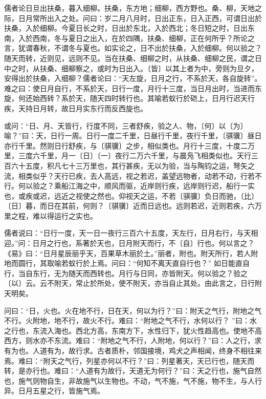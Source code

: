 \documentclass[]{article}
\begin{document}
儒者论日旦出扶桑，暮入细柳。扶桑，东方地；细柳，西方野也。桑、柳，天地之际，日月常所出入之处。问曰：岁二月八月时，日出正东，日入正西，可谓日出於扶桑，入於细柳。今夏日长之时，日出於东北，入於西北；冬日短之时，日出东南，入於西南，冬与夏日之出入，在於四隅，扶桑、细柳，正在何所乎？所论之言，犹谓春秋，不谓冬与夏也。如实论之，日不出於扶桑，入於细柳。何以验之？随天而转，近则见，远则不见。当在扶桑、细柳之时，从扶桑、细柳之民，谓之日中之时，从扶桑、细柳察之，或时为日出入。〔皆〕以其上者为中，旁则为旦夕，安得出於扶桑，入细柳？儒者论曰：``天左旋，日月之行，不系於天，各自旋转''。难之曰：使日月自行，不系於天，日行一度，月行十三度，当日月出时，当进而东旋，何还始西转？系於天，随天四时转行也。其喻若蚁行於硙上，日月行迟天行疾，天持日月转，故日月实东行而反西旋也。

或问：``日、月、天皆行，行度不同，三者舒疾，验之人、物，〔何〕以〔为〕喻？''曰：天，日行一周。日行一度二千里，日昼行千里，夜行千里，〔骐骥〕昼日亦行千里。然则日行舒疾，与〔骐骥〕之步，相似类也。月行十三度，十度二万里，三度六千里，月一〔日〕〔一〕夜行二万六千里，与晨凫飞相类似也。天行三百六十五度，积凡七十三万里也，其行甚疾，无以为验，当与陶钧之运，弩矢之流，相类似乎？天行已疾，去人高远，视之若迟，盖望远物者，动若不动，行若不行。何以验之？乘船江海之中，顺风而驱，近岸则行疾，远岸则行迟，船行一实也，或疾或迟，远近之视使之然也。仰视天之运，不若〔骐骥〕负日而驰，〔比〕〔日〕暮，而日在其前，何则？〔骐骥〕近而日远也。远则若迟，近则若疾，六万里之程，难以得运行之实也。

儒者说曰：``日行一度，天一日一夜行三百六十五度，天左行，日月右行，与天相迎。''问：日月之行也，系著於天也，日月附天而行，不〔自〕行也。何以言之？《易》曰：``日月星辰丽乎天，百果草木丽於土。''丽者，附也。附天所行，若人附地而圆行，其取喻若蚁行於上焉。问曰：``何知不离天直自行也？''
如日能直自行，当自东行，无为随天而西转也。月行与日同，亦皆附天。何以验之？验之〔以〕云。云不附天，常止於所处，使不附天，亦当自止其处。由此言之，日行附天明矣。

问曰：``日，火也。火在地不行，日在天，何以为行？''曰：附天之气行，附地之气不行。火附地，地不行，故火不行。难曰：``附地之气不行，水何以行？
''曰：水之行也，东流入海也。西北方高，东南方下，水性归下，犹火性趋高也。使地不高西方，则水亦不东流。难曰：``附地之气不行，人附地，何以行？''曰：人之行，求有为也。人道有为，故行求。古者质朴，邻国接境，鸡犬之声相闻，终身不相往来焉。难曰：``附天之气行，列星亦何以不行？''曰：列星著天，天已行也，随天而转，是亦行也。难曰：``人道有为故行，天道无为何行？''曰：天之行也，施气自然也，施气则物自生，非故施气以生物也。不动，气不施，气不施，物不生，与人行异。日月五星之行，皆施气焉。
\end{document}
